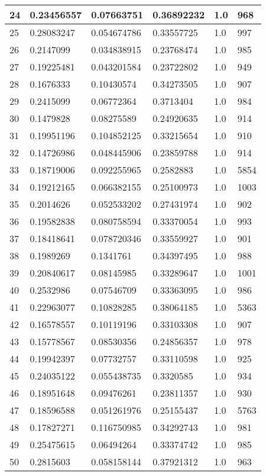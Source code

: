 \begin{longtable}{|l|l|l|l|l|l|}
24 & 0.23456557 & 0.07663751 & 0.36892232 & 1.0 & 968 \\ \hline 
25 & 0.28083247 & 0.054674786 & 0.33557725 & 1.0 & 997 \\ \hline 
26 & 0.2147099 & 0.034838915 & 0.23768474 & 1.0 & 985 \\ \hline 
27 & 0.19225481 & 0.043201584 & 0.23722802 & 1.0 & 949 \\ \hline 
28 & 0.1676333 & 0.10430574 & 0.34273505 & 1.0 & 907 \\ \hline 
29 & 0.2415099 & 0.06772364 & 0.3713404 & 1.0 & 984 \\ \hline 
30 & 0.1479828 & 0.08275589 & 0.24920635 & 1.0 & 914 \\ \hline 
31 & 0.19951196 & 0.104852125 & 0.33215654 & 1.0 & 910 \\ \hline 
32 & 0.14726986 & 0.048445906 & 0.23859788 & 1.0 & 914 \\ \hline 
33 & 0.18719006 & 0.092255965 & 0.2582883 & 1.0 & 5854 \\ \hline 
34 & 0.19212165 & 0.066382155 & 0.25100973 & 1.0 & 1003 \\ \hline 
35 & 0.2014626 & 0.052533202 & 0.27431974 & 1.0 & 902 \\ \hline 
36 & 0.19582838 & 0.080758594 & 0.33370054 & 1.0 & 993 \\ \hline 
37 & 0.18418641 & 0.078720346 & 0.33559927 & 1.0 & 901 \\ \hline 
38 & 0.1989269 & 0.1341761 & 0.34397495 & 1.0 & 988 \\ \hline 
39 & 0.20840617 & 0.08145985 & 0.33289647 & 1.0 & 1001 \\ \hline 
40 & 0.2532986 & 0.07546709 & 0.33363095 & 1.0 & 986 \\ \hline 
41 & 0.22963077 & 0.10828285 & 0.38064185 & 1.0 & 5363 \\ \hline 
42 & 0.16578557 & 0.10119196 & 0.33103308 & 1.0 & 907 \\ \hline 
43 & 0.15778567 & 0.08530356 & 0.24856357 & 1.0 & 978 \\ \hline 
44 & 0.19942397 & 0.07732757 & 0.33110598 & 1.0 & 925 \\ \hline 
45 & 0.24035122 & 0.055438735 & 0.3320585 & 1.0 & 934 \\ \hline 
46 & 0.18951648 & 0.09476261 & 0.23811357 & 1.0 & 930 \\ \hline 
47 & 0.18596588 & 0.051261976 & 0.25155437 & 1.0 & 5763 \\ \hline 
48 & 0.17827271 & 0.116750985 & 0.34292743 & 1.0 & 981 \\ \hline 
49 & 0.25475615 & 0.06494264 & 0.33374742 & 1.0 & 985 \\ \hline 
50 & 0.2815603 & 0.058158144 & 0.37921312 & 1.0 & 963 \\ \hline 
\end{longtable}